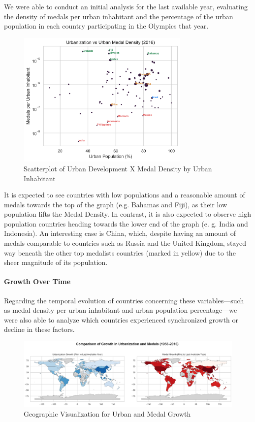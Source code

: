 \documentclass{article}
\begin{document}
We were able to conduct an initial analysis for the last available year, evaluating the density of medals per urban inhabitant and the percentage of the urban population in each country participating in the Olympics that year.

\begin{figure}[H]
\centering
\includegraphics[width=0.75\textwidth]{images/urban/urban_medal_density.png}
\caption{\label{fig3}Scatterplot of Urban Development X Medal Density by Urban Inhabitant}
\end{figure}

It is expected to see countries with low populations and a reasonable amount of medals towards the top of the graph (e.g. Bahamas and Fiji), as their low population lifts the Medal Density. In contrast, it is also expected to observe high population countries heading towards the lower end of the graph (e. g. India and Indonesia). An interesting case is China, which, despite having an amount of medals comparable to countries such as Russia and the United Kingdom, stayed way beneath the other top medalists countries (marked in yellow) due to the sheer magnitude of its population.
\paragraph{Growth Over Time}
Regarding the temporal evolution of countries concerning these variables—such as medal density per urban inhabitant and urban population percentage—we were also able to analyze which countries experienced synchronized growth or decline in these factors.

\begin{figure}[H]
\centering
\includegraphics[width=1\textwidth]{images/urban/geographic_growth.png}
\caption{\label{fig3}Geographic Visualization for Urban and Medal Growth}
\end{figure}
\end{document}
